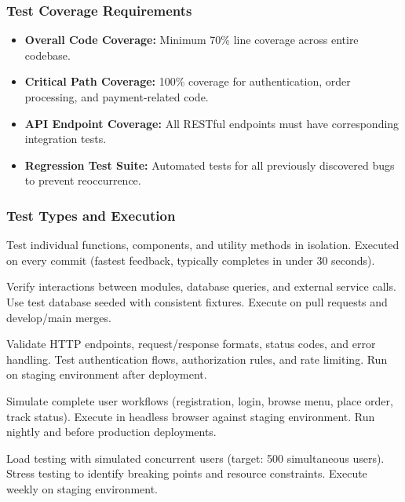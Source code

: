\documentclass[12pt,a4paper]{article}
\begin{document}
\subsubsection{Test Coverage Requirements}

\begin{tcolorbox}[colback=lightgray, colframe=primaryblue, boxrule=0.8pt, arc=3pt, left=10pt, right=10pt, top=8pt, bottom=8pt]

\begin{itemize}[leftmargin=2em, itemsep=8pt]
    \item \textbf{Overall Code Coverage:} Minimum 70\% line coverage across entire codebase.
    \item \textbf{Critical Path Coverage:} 100\% coverage for authentication, order processing, and payment-related code.
    \item \textbf{API Endpoint Coverage:} All RESTful endpoints must have corresponding integration tests.
    \item \textbf{Regression Test Suite:} Automated tests for all previously discovered bugs to prevent reoccurrence.
\end{itemize}

\end{tcolorbox}

\subsubsection{Test Types and Execution}

\begin{description}[leftmargin=2em, itemsep=8pt, style=nextline]
    \item[\textbf{Unit Tests:}] Test individual functions, components, and utility methods in isolation. Executed on every commit (fastest feedback, typically completes in under 30 seconds).
    
    \item[\textbf{Integration Tests:}] Verify interactions between modules, database queries, and external service calls. Use test database seeded with consistent fixtures. Execute on pull requests and develop/main merges.
    
    \item[\textbf{API Tests:}] Validate HTTP endpoints, request/response formats, status codes, and error handling. Test authentication flows, authorization rules, and rate limiting. Run on staging environment after deployment.
    
    \item[\textbf{End-to-End Tests:}] Simulate complete user workflows (registration, login, browse menu, place order, track status). Execute in headless browser against staging environment. Run nightly and before production deployments.
    
    \item[\textbf{Performance Tests:}] Load testing with simulated concurrent users (target: 500 simultaneous users). Stress testing to identify breaking points and resource constraints. Execute weekly on staging environment.
\end{description}
\end{document}
